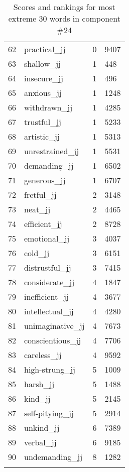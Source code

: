\begin{longtable}[!htbp]{| rlr@{.}l |}
    62 & practical\_jj & 0 & 9407 \\
    63 & shallow\_jj & 1 & 448 \\
    64 & insecure\_jj & 1 & 496 \\
    65 & anxious\_jj & 1 & 1248 \\
    66 & withdrawn\_jj & 1 & 4285 \\
    67 & trustful\_jj & 1 & 5233 \\
    68 & artistic\_jj & 1 & 5313 \\
    69 & unrestrained\_jj & 1 & 5531 \\
    70 & demanding\_jj & 1 & 6502 \\
    71 & generous\_jj & 1 & 6707 \\
    72 & fretful\_jj & 2 & 3148 \\
    73 & neat\_jj & 2 & 4465 \\
    74 & efficient\_jj & 2 & 8728 \\
    75 & emotional\_jj & 3 & 4037 \\
    76 & cold\_jj & 3 & 6151 \\
    77 & distrustful\_jj & 3 & 7415 \\
    78 & considerate\_jj & 4 & 1847 \\
    79 & inefficient\_jj & 4 & 3677 \\
    80 & intellectual\_jj & 4 & 4280 \\
    81 & unimaginative\_jj & 4 & 7673 \\
    82 & conscientious\_jj & 4 & 7706 \\
    83 & careless\_jj & 4 & 9592 \\
    84 & high-strung\_jj & 5 & 1009 \\
    85 & harsh\_jj & 5 & 1488 \\
    86 & kind\_jj & 5 & 2145 \\
    87 & self-pitying\_jj & 5 & 2914 \\
    88 & unkind\_jj & 6 & 7389 \\
    89 & verbal\_jj & 6 & 9185 \\
    90 & undemanding\_jj & 8 & 1282 \\
    \hline
    \caption{Scores and rankings for most extreme 30 words in component \#24} \\
\end{longtable}
